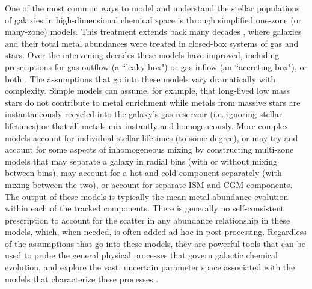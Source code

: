 One of the most common ways to model and understand the stellar populations of galaxies in high-dimensional chemical space is through simplified one-zone (or many-zone) models. This treatment extends back many decades \citep[e.g.][]{Schmidt1963,TalbotArnett1971,Lynden-Bell1975}, where galaxies and their total metal abundances were treated in closed-box systems of gas and stars. Over the intervening decades these models have improved, including prescriptions for gas outflow (a ``leaky-box") or gas inflow (an ``accreting box"), or both \citep[a ``bathtub" model, e.g.][]{FinlatorDave2008,Bouche2010}. The assumptions that go into these models vary dramatically with complexity. Simple models can assume, for example, that long-lived low mass stars do not contribute to metal enrichment while metals from massive stars are instantaneously recycled into the galaxy's gas reservoir (i.e. ignoring stellar lifetimes) or that all metals mix instantly and homogeneously. More complex models account for individual stellar lifetimes (to some degree), or may try and account for some aspects of inhomogeneous mixing by constructing multi-zone models that may separate a galaxy in radial bins (with or without mixing between bins), may account for a hot and cold component separately (with mixing between the two), or account for separate ISM and CGM components. The output of these models is typically the mean metal abundance evolution within each of the tracked components. There is generally no self-consistent prescription to account for the scatter in any abundance relationship in these models, which, when needed, is often added ad-hoc in post-processing. Regardless of the assumptions that go into these models, they are powerful tools that can be used to probe the general physical processes that govern galactic chemical evolution, and explore the vast, uncertain parameter space associated with the models that characterize these processes \citep[e.g.][]{Cote2017a}.

